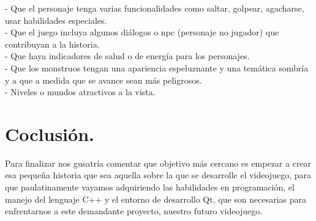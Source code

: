 \documentclass{article}
\begin{document}
- Que el personaje tenga varias funcionalidades como saltar, golpear, agacharse, usar habilidades especiales.\\

- Que el juego incluya algunos diálogos o npc (personaje no jugador) que contribuyan a la historia.\\

- Que haya indicadores de salud o de energía para los personajes.\\

- Que los monstruos tengan una apariencia espeluznante y una temática sombría y a que a medida que se avance sean más peligrosos.\\

- Niveles o mundos atractivos a la vista.\\




\section{Coclusión.} \label{Conclusión.}

Para finalizar nos gusatría comentar que objetivo más cercano es empezar a crear esa pequeña historia que sea aquella sobre la que se desarrolle el videojuego, para que paulatinamente vayamos adquiriendo las habilidades en programación, el manejo del lenguaje C++ y el entorno de desarrollo Qt, que son necesarias para enfrentarnos a este demandante proyecto, nuestro futuro videojuego.
\end{document}
